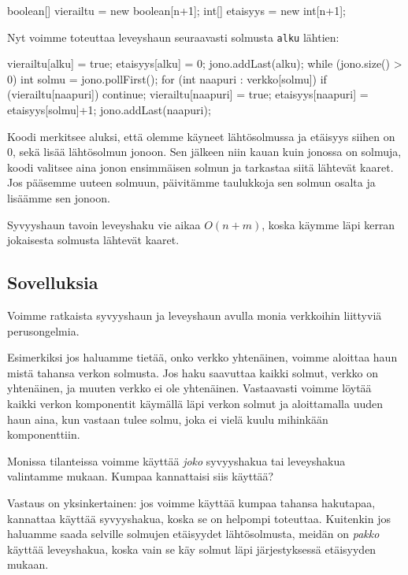 \begin{code}
boolean[] vierailtu = new boolean[n+1];
int[] etaisyys = new int[n+1];
\end{code}

Nyt voimme toteuttaa leveyshaun seuraavasti solmusta \texttt{alku} lähtien:

\begin{code}
vierailtu[alku] = true;
etaisyys[alku] = 0;
jono.addLast(alku);
while (jono.size() > 0) {
    int solmu = jono.pollFirst();
    for (int naapuri : verkko[solmu]) {
        if (vierailtu[naapuri]) continue;
        vierailtu[naapuri] = true;
        etaisyys[naapuri] = etaisyys[solmu]+1;
        jono.addLast(naapuri);
    }
}
\end{code}

Koodi merkitsee aluksi, että olemme käyneet lähtösolmussa
ja etäisyys siihen on 0, sekä lisää lähtösolmun jonoon.
Sen jälkeen niin kauan kuin jonossa on solmuja,
koodi valitsee aina jonon ensimmäisen solmun
ja tarkastaa siitä lähtevät kaaret.
Jos pääsemme uuteen solmuun, päivitämme taulukkoja
sen solmun osalta ja lisäämme sen jonoon.

Syvyyshaun tavoin leveyshaku vie aikaa $O(n+m)$,
koska käymme läpi kerran jokaisesta solmusta lähtevät kaaret.

\subsection{Sovelluksia}

Voimme ratkaista syvyyshaun ja leveyshaun avulla monia
verkkoihin liittyviä perusongelmia.

Esimerkiksi jos haluamme tietää, onko verkko yhtenäinen,
voimme aloittaa haun mistä tahansa verkon solmusta.
Jos haku saavuttaa kaikki solmut, verkko on yhtenäinen,
ja muuten verkko ei ole yhtenäinen.
Vastaavasti voimme löytää kaikki verkon komponentit
käymällä läpi verkon solmut ja aloittamalla uuden haun aina,
kun vastaan tulee solmu, joka ei vielä kuulu mihinkään komponenttiin.

Monissa tilanteissa voimme käyttää \emph{joko} syvyyshakua tai
leveyshakua valintamme mukaan.
Kumpaa kannattaisi siis käyttää?

Vastaus on yksinkertainen: jos voimme käyttää kumpaa tahansa hakutapaa,
kannattaa käyttää syvyyshakua, koska se on helpompi toteuttaa.
Kuitenkin jos haluamme saada selville solmujen etäisyydet lähtösolmusta,
meidän on \emph{pakko} käyttää leveyshakua, koska vain se käy solmut
läpi järjestyk\-sessä etäisyyden mukaan.

